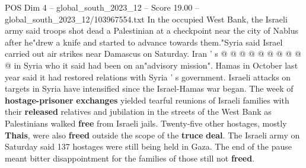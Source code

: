 \begin{textsample}{POS Dim 4 – global\_south\_2023\_12 – Score 19.00 – global\_south\_2023\_12/103967554.txt}
In the occupied West Bank, the Israeli army said troops shot dead a Palestinian at a checkpoint near the city of Nablus after he"drew a knife and started to advance towards them."Syria said Israel carried out air strikes near Damascus on Saturday.
Iran ' s @ @ @ @ @ @ @ @ @ @ in Syria who it said had been on an"advisory mission".
Hamas in October last year said it had restored relations with Syria ' s government.
Israeli attacks on targets in Syria have intensified since the Israel-Hamas war began.
The week of \textbf{hostage-prisoner} \textbf{exchanges} yielded tearful reunions of Israeli families with their \textbf{released} relatives and jubilation in the streets of the West Bank as Palestinians walked \textbf{free} from Israeli jails.
Twenty-five other hostages, mostly \textbf{Thais}, were also \textbf{freed} outside the scope of the \textbf{truce} \textbf{deal}.
The Israeli army on Saturday said 137 hostages were still being held in Gaza.
The end of the pause meant bitter disappointment for the families of those still not \textbf{freed}.

\end{textsample}
